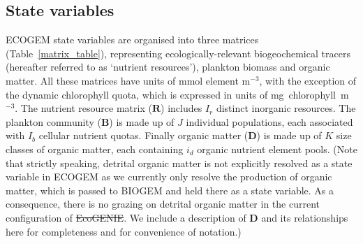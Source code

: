 \documentclass[gmd, manuscript]{copernicus}
\newcommand{\matr}[1]{\mathbf{#1}}
\providecommand{\DIFadd}[1]{{\protect\color{blue}\uwave{#1}}} %
\providecommand{\DIFdel}[1]{{\protect\color{red}\sout{#1}}}                      %
\providecommand{\DIFaddbegin}{} %
\providecommand{\DIFaddend}{} %
\providecommand{\DIFdelbegin}{} %
\providecommand{\DIFdelend}{} %
\begin{document}

\subsection{State variables}\label{StateVariables}

ECOGEM state variables are organised into three matrices (Table~\ref{matrix_table}), representing ecologically-relevant biogeochemical tracers (hereafter referred to as `nutrient resources'), plankton biomass and organic matter. All these matrices have units of mmol element m$^{-3}$, with the exception of the dynamic chlorophyll quota, which is expressed in units of mg~chlorophyll~m$^{-3}$. The nutrient resource matrix ($\matr{R}$) includes $I_r$ distinct inorganic resources. The plankton community ($\matr{B}$) is made up of $J$ individual populations, each associated with $I_b$ cellular nutrient quotas. Finally organic matter ($\matr{D}$) is made up of $K$ size classes of organic matter, each containing $i_d$ organic nutrient element pools. (Note that strictly speaking, detrital organic matter is not explicitly resolved as a state variable in ECOGEM as we currently only resolve the production of organic matter, which is passed to BIOGEM and held there as a state variable.  As a consequence, there is no grazing on detrital organic matter in the current configuration of \DIFdelbegin \DIFdel{EcoGENIE}\DIFdelend \DIFaddbegin \DIFadd{EcoGEnIE}\DIFaddend . We include  a description of $\matr{D}$ and its relationships here for completeness and for convenience of notation.)

\end{document}
